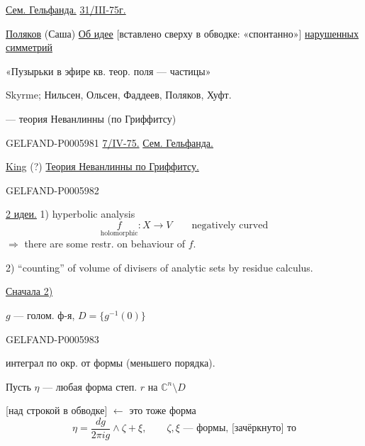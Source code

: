 \underline{Сем. Гельфанда.} \underline{31/III-75г.}

\underline{Поляков} (Саша)
\underline{Об идее} [вставлено сверху в обводке: «спонтанно»] \underline{нарушенных симметрий}

«Пузырьки в эфире кв. теор. поля — частицы»

Skyrme; Нильсен, Ольсен, Фаддеев, Поляков, Хуфт.

 — теория Неванлинны (по Гриффитсу)


\begin{GelfandAdjacentEvidence}{GELFAND-P000598}{1}
\underline{7/IV-75.} \underline{Сем. Гельфанда.}

\underline{King} (?) \underline{Теория Неванлинны по Гриффитсу.}
\end{GelfandAdjacentEvidence}
\begin{GelfandAdjacentEvidence}{GELFAND-P000598}{2}


\underline{2 идеи.} 1) hyperbolic analysis
\[
\underset{\text{holomorphic}}{f}:X\to V\qquad\text{negatively curved}
\]
\(\Rightarrow\) there are some restr. on behaviour of \(f\).

2) ``counting'' of volume of divisers of analytic sets by residue calculus.

\underline{Сначала 2)}

\(g\) — голом. ф-я, \(D=\{g^{-1}(0)\}\)

\end{GelfandAdjacentEvidence}
\begin{GelfandAdjacentEvidence}{GELFAND-P000598}{3}


интеграл по окр. от формы (меньшего порядка).

Пусть \(\eta\) — любая форма степ. \(r\) на \(\mathbb C^n\setminus D\)

[над строкой в обводке] \(\leftarrow\) это тоже форма
\[
\eta=\frac{dg}{2\pi ig}\wedge\zeta+\xi,\qquad
\zeta,\xi\text{ — формы, [зачёркнуто] то}
\]
\end{GelfandAdjacentEvidence}
